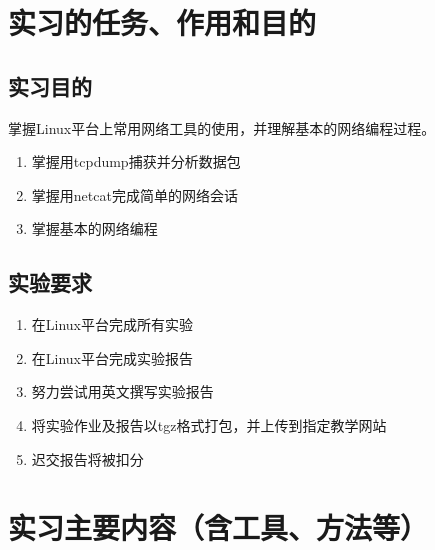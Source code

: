 \documentclass{swfulabreport}
\begin{document}
\maketitle

\tableofcontents
\clearpage

\section{实习的任务、作用和目的}\label{ux5b9eux4e60ux7684ux4efbux52a1ux4f5cux7528ux548cux76eeux7684}

\subsection{实习目的}\label{ux5b9eux4e60ux76eeux7684}

掌握Linux平台上常用网络工具的使用，并理解基本的网络编程过程。

\begin{enumerate}
\def\labelenumi{\arabic{enumi}.}
\tightlist
\item
  掌握用tcpdump捕获并分析数据包\\
\item
  掌握用netcat完成简单的网络会话\\
\item
  掌握基本的网络编程
\end{enumerate}

\subsection{实验要求}\label{ux5b9eux9a8cux8981ux6c42}

\begin{enumerate}
\def\labelenumi{\arabic{enumi}.}
\tightlist
\item
  在Linux平台完成所有实验\\
\item
  在Linux平台完成实验报告\\
\item
  努力尝试用英文撰写实验报告\\
\item
  将实验作业及报告以tgz格式打包，并上传到指定教学网站\\
\item
  迟交报告将被扣分
\end{enumerate}

\section{实习主要内容（含工具、方法等）}\label{ux5b9eux4e60ux4e3bux8981ux5185ux5bb9ux542bux5de5ux5177ux65b9ux6cd5ux7b49}
\end{document}
